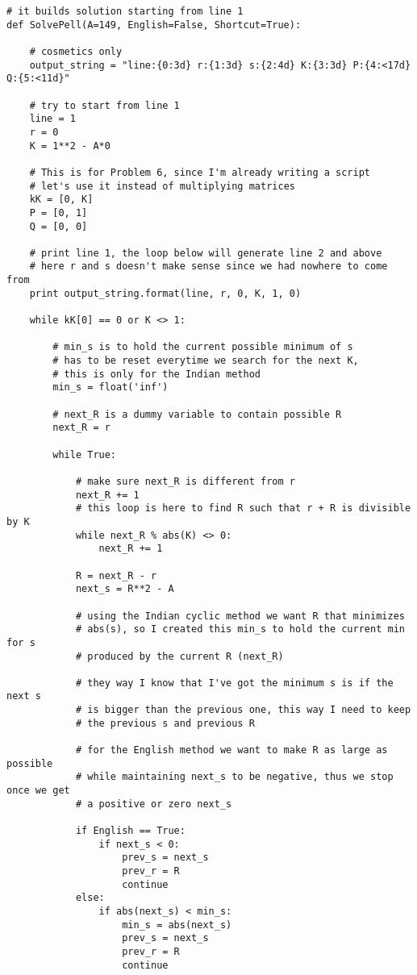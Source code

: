 \documentclass[aps,preprint,preprintnumbers,nofootinbib,showpacs,prd]{revtex4-1}
\begin{document}
\begin{Verbatim}[baselinestretch=0.75]
# it builds solution starting from line 1
def SolvePell(A=149, English=False, Shortcut=True):

    # cosmetics only
    output_string = "line:{0:3d} r:{1:3d} s:{2:4d} K:{3:3d} P:{4:<17d} Q:{5:<11d}"

    # try to start from line 1
    line = 1
    r = 0
    K = 1**2 - A*0

    # This is for Problem 6, since I'm already writing a script
    # let's use it instead of multiplying matrices
    kK = [0, K]
    P = [0, 1]
    Q = [0, 0]

    # print line 1, the loop below will generate line 2 and above
    # here r and s doesn't make sense since we had nowhere to come from
    print output_string.format(line, r, 0, K, 1, 0)
    
    while kK[0] == 0 or K <> 1:
        
        # min_s is to hold the current possible minimum of s
        # has to be reset everytime we search for the next K,
        # this is only for the Indian method
        min_s = float('inf')
        
        # next_R is a dummy variable to contain possible R
        next_R = r
        
        while True:

            # make sure next_R is different from r
            next_R += 1
            # this loop is here to find R such that r + R is divisible by K
            while next_R % abs(K) <> 0:
                next_R += 1

            R = next_R - r
            next_s = R**2 - A

            # using the Indian cyclic method we want R that minimizes
            # abs(s), so I created this min_s to hold the current min for s
            # produced by the current R (next_R)

            # they way I know that I've got the minimum s is if the next s
            # is bigger than the previous one, this way I need to keep
            # the previous s and previous R

            # for the English method we want to make R as large as possible
            # while maintaining next_s to be negative, thus we stop once we get
            # a positive or zero next_s

            if English == True:
                if next_s < 0:
                    prev_s = next_s
                    prev_r = R
                    continue
            else:               
                if abs(next_s) < min_s:
                    min_s = abs(next_s)
                    prev_s = next_s
                    prev_r = R
                    continue


\end{Verbatim}
\end{document}
